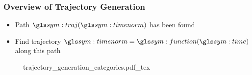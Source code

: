 \documentclass{beamer}
\begin{document}
	\begin{frame}
		\frametitle{Overview of Trajectory Generation}

		\begin{itemize}

			\item

				Path $\pathsym(\timenorm)$ has been found

			\item

				Find trajectory $\timenorm = \function(\timesym)$ along this
				path
		\end{itemize}

		\begin{figure}[hb]
			\centering
			\def\svgwidth{\columnwidth}
			{trajectory_generation_categories.pdf_tex}
		\end{figure}
	\end{frame}
\end{document}
